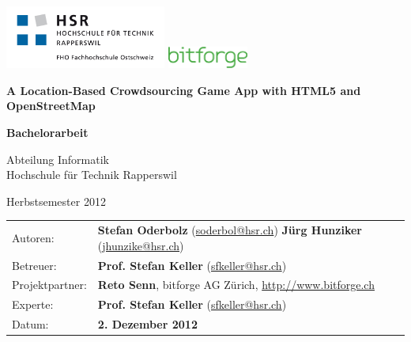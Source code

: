 \begin{titlepage}

\includegraphics[width=200px]{images/titlepage/logo-hsr}
\hfill
\includegraphics[width=100px]{images/titlepage/logo-bitforge}
\vspace{2.2cm}

\begin{center}
{ \Large
	\textbf{A Location-Based Crowdsourcing Game App with HTML5 and OpenStreetMap}
	\vspace{1cm}

	\textbf{Bachelorarbeit}
	\vspace{1cm}

	Abteilung Informatik \\[0.2cm]
	Hochschule für Technik Rapperswil
	\vspace{1cm}

	Herbstsemester 2012
}
\end{center}
\vspace{2.3cm}

\begin{tabular}{p{0.19\twocelltabwidth}p{0.81\twocelltabwidth}}
Autoren: & \textbf{Stefan Oderbolz} (\url{soderbol@hsr.ch}) \newline
 \textbf{Jürg Hunziker} (\url{jhunzike@hsr.ch}) \\ 
Betreuer: & \textbf{Prof. Stefan Keller} (\url{sfkeller@hsr.ch}) \\ 
Projektpartner: & \textbf{Reto Senn}, bitforge AG Zürich, \url{http://www.bitforge.ch} \\ 
Experte: & \textbf{Prof. Stefan Keller} (\url{sfkeller@hsr.ch}) \\ 
Datum: & \textbf{2. Dezember 2012} \\ 
\end{tabular}

\end{titlepage}